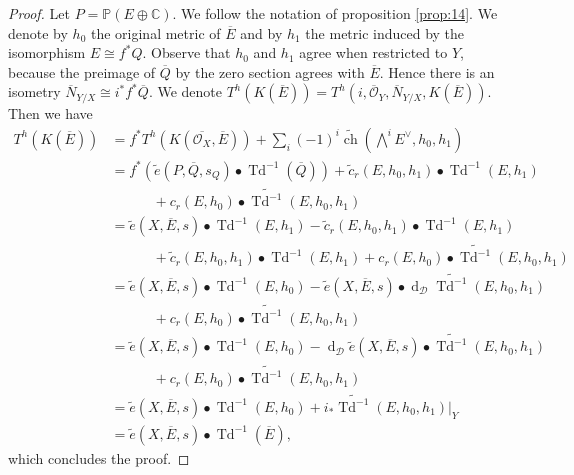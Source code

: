 \documentclass[10pt,twoside]{article}
\numberwithin{equation}{section}
\theoremstyle{plain}
\theoremstyle{definition}
\DeclareMathOperator{\Td}{Td}
\DeclareMathOperator{\dd}{d}
\DeclareMathOperator{\ch}{ch}
\begin{document}
\begin{proof}
  Let $P=\mathbb{P}(E\oplus \mathbb{C})$. We follow the notation of
  proposition \ref{prop:14}. We denote by $h_{0}$ the original metric
  of $\overline E$ and by $h_{1}$ the metric induced by the
  isomorphism $E\cong f^{\ast}Q$. Observe that $h_{0}$ and $h_{1}$
  agree when restricted to $Y$, because the preimage of
  $\overline Q$ by the zero section agrees with $\overline E$. Hence
  there is an isometry
  $\overline N_{Y/X}\cong i^{\ast}f^{\ast}\overline Q$. We
  denote $T^{h}(K(\overline E))=T^{h}(i,\overline
  {\mathcal{O}}_{Y},\overline N_{Y/X},K(\overline E))$.   
  Then we have
  \begin{align*}
    T^{h}(K(\overline E))&=f^{\ast}T^{h}(K(\overline
    {\mathcal{O}_{X}},\overline E))+\sum_{i}(-1)^{i}\widetilde
    {\ch}(\bigwedge^{i}E^{\vee},h_{0},h_{1})\\
    &=f^{\ast}(\widetilde e(P,\overline Q,s_{Q})\bullet
    \Td^{-1}(\overline Q))+\widetilde c_{r}(E,h_{0},h_{1})\bullet
    \Td^{-1}(E,h_{1})\\
    &\phantom{AAAA}
    +
    c_{r}(E,h_{0})\bullet \widetilde{\Td^{-1}}(E,h_{0},h_{1})\\
    &=\widetilde e(X,\overline E,s)\bullet \Td^{-1}(E,h_{1})
    -\widetilde c_{r}(E,h_{0},h_{1})\bullet \Td^{-1}(E,h_{1})\\
    &\phantom{AAAA}
    +
    \widetilde c_{r}(E,h_{0},h_{1})\bullet \Td^{-1}(E,h_{1})+
    c_{r}(E,h_{0})\bullet \widetilde{\Td^{-1}}(E,h_{0},h_{1})\\
    &=\widetilde e(X,\overline E,s)\bullet \Td^{-1}(E,h_{0})-
    \widetilde e(X,\overline E,s)\bullet \dd_{\mathcal{D}}\widetilde
    {\Td^{-1}}(E,h_{0},h_{1}) \\
    &\phantom{AAAA}
    +c_{r}(E,h_{0})\bullet
    \widetilde{\Td^{-1}}(E,h_{0},h_{1})\\ 
    &=\widetilde e(X,\overline E,s)\bullet \Td^{-1}(E,h_{0})-
    \dd_{\mathcal{D}} \widetilde e(X,\overline E,s)\bullet \widetilde
    {\Td^{-1}}(E,h_{0},h_{1}) \\
    &\phantom{AAAA}
    +c_{r}(E,h_{0})\bullet
    \widetilde{\Td^{-1}}(E,h_{0},h_{1})\\ 
    &=\widetilde e(X,\overline E,s)\bullet \Td^{-1}(E,h_{0})
    +i_{\ast}\widetilde{\Td^{-1}}(E,h_{0},h_{1})|_{Y}\\
    &=\widetilde e(X,\overline E,s)\bullet \Td^{-1}(\overline E),
  \end{align*}
which concludes the proof.
\end{proof}
\end{document}
